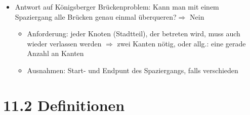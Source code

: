 \begin{itemize}
    \item Antwort auf Königsberger Brückenproblem: \glqq Kann man mit einem Spaziergang alle Brücken genau einmal überqueren?\grqq $\Rightarrow$ Nein
    \begin{itemize}
        \item Anforderung: jeder Knoten (Stadtteil), der betreten wird, muss auch wieder verlassen werden $\Rightarrow$ zwei Kanten nötig, oder allg.: eine gerade Anzahl an Kanten
        \item Ausnahmen: Start- und Endpunt des Spaziergangs, falls verschieden
    \end{itemize}
\end{itemize}

\section*{11.2 Definitionen}
